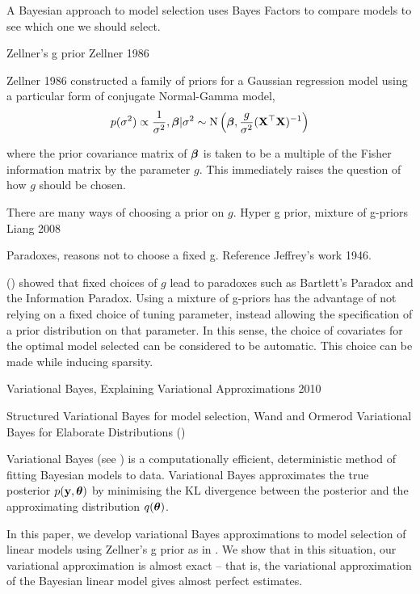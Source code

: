 \documentclass{amsart}[12pt]
\begin{document}
A Bayesian approach to model selection uses Bayes Factors to compare models to see which one we should
select.


Zellner's g prior Zellner 1986

Zellner 1986 constructed a family of priors for a Gaussian regression model using a particular form
of conjugate Normal-Gamma model,
\begin{equation*}
p(\sigma^2) \propto \frac{1}{\sigma^2}, {\boldsymbol \beta}|\sigma^2 \sim \text{N}\left({\boldsymbol \beta}, \frac{g}{\sigma^2} ({\bf X}^\top {\bf X})^{-1}\right)
\end{equation*}

where the prior covariance matrix of ${\boldsymbol \beta}$ is taken to be a multiple of the Fisher information 
matrix by the parameter $g$. This immediately raises the question of how $g$ should be chosen.

There are many ways of choosing a prior on $g$.
Hyper g prior, mixture of g-priors Liang 2008

Paradoxes, reasons not to choose a fixed g. Reference Jeffrey's work 1946. \cite{Society2016}

(\cite{Liang2008}) showed that fixed choices of $g$ lead to paradoxes such as Bartlett's Paradox and
the Information Paradox.
Using a mixture of g-priors has the advantage of not relying on a fixed choice of tuning
parameter, instead allowing the specification of a prior distribution on that parameter. In this sense, the 
choice of covariates for the optimal model selected can be considered to be automatic. This choice can be
made while inducing sparsity.


Variational Bayes, Explaining Variational Approximations 2010

Structured Variational Bayes for model selection, Wand and Ormerod Variational Bayes for Elaborate 
Distributions (\cite{Wand2011})


Variational Bayes (see \cite{Ormerod2010}) is a computationally efficient, deterministic method of fitting
Bayesian models to data. Variational Bayes approximates the true posterior $p({\bf y}, {\boldsymbol \theta})$ by minimising the
KL divergence between the posterior and the  approximating distribution $q({\boldsymbol \theta})$.



In this paper, we develop variational Bayes approximations to model selection of linear models using
Zellner's g prior as in \cite{Liang2008}. We show that in this situation, our variational approximation
is almost exact -- that is, the variational approximation of the Bayesian linear model gives almost perfect
estimates.
\end{document}
